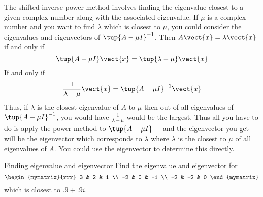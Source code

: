 The shifted inverse power method involves finding the eigenvalue closest to
a given complex number along with the associated eigenvalue. If $\mu $ is a
complex number and you want to find $\lambda $ which is closest to $\mu$,
you could consider the eigenvalues and eigenvectors of $\tup{A-\mu
I} ^{-1}$. Then $A\vect{x}=\lambda \vect{x}$ if and only if 
\begin{equation*}
\tup{A-\mu I} \vect{x}=\tup{\lambda -\mu } \vect{x}
\end{equation*}
If and only if 
\begin{equation*}
\frac{1}{\lambda -\mu }\vect{x}=\tup{A-\mu I} ^{-1}\vect{x}
\end{equation*}
Thus, if $\lambda $ is the closest eigenvalue of $A$ to $\mu $ then out of
all eigenvalues of $\tup{A-\mu I} ^{-1}$, you would have $\frac{1}{
\lambda -\mu }$ would be the largest. Thus all you have to do is apply the
power method to $\tup{A-\mu I} ^{-1}$ and the eigenvector you get
will be the eigenvector which corresponds to $\lambda $ where $\lambda $ is
the closest to $\mu $ of all eigenvalues of $A$. You could use the
eigenvector to determine this directly.

\begin{example}{Finding eigenvalue and eigenvector}{}
Find the eigenvalue and eigenvector for 
\begin{equation*}
\begin{mymatrix}{rrr}
3 & 2 & 1 \\ 
-2 & 0 & -1 \\ 
-2 & -2 & 0
\end{mymatrix}
\end{equation*}
which is closest to $.9+.9i$.
\end{example}

